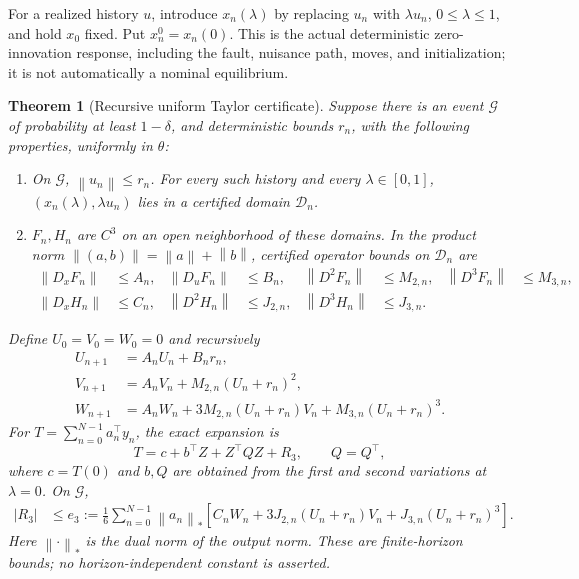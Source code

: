 \documentclass[11pt]{article}
\newtheorem{theorem}{Theorem}
\theoremstyle{remark}\newtheorem{remark}[theorem]{Remark}
\newcommand{\norm}[1]{\left\lVert#1\right\rVert}
\begin{document}
For a realized history $u$, introduce $x_n(\lambda)$ by replacing $u_n$ with $\lambda u_n$, $0\le\lambda\le1$, and hold $x_0$ fixed. Put $x_n^0=x_n(0)$. This is the actual deterministic zero-innovation response, including the fault, nuisance path, moves, and initialization; it is not automatically a nominal equilibrium.

\begin{theorem}[Recursive uniform Taylor certificate]\label{thm:taylor}
Suppose there is an event $\mathcal G$ of probability at least $1-\delta$, and deterministic bounds $r_n$, with the following properties, uniformly in $\theta$:
\begin{enumerate}
\item On $\mathcal G$, $\norm{u_n}\le r_n$. For every such history and every $\lambda\in[0,1]$, $(x_n(\lambda),\lambda u_n)$ lies in a certified domain $\mathcal D_n$.
\item $F_n,H_n$ are $C^3$ on an open neighborhood of these domains. In the product norm $\norm{(a,b)}=\norm a+\norm b$, certified operator bounds on $\mathcal D_n$ are
\begin{align*}
\norm{D_xF_n}&\le A_n,&\norm{D_uF_n}&\le B_n,
&\norm{D^2F_n}&\le M_{2,n},&\norm{D^3F_n}&\le M_{3,n},\\
\norm{D_xH_n}&\le C_n,&\norm{D^2H_n}&\le J_{2,n},
&\norm{D^3H_n}&\le J_{3,n}.
\end{align*}
\end{enumerate}
Define $U_0=V_0=W_0=0$ and recursively
\begin{align}
 U_{n+1}&=A_nU_n+B_nr_n,\label{eq:u}\\
 V_{n+1}&=A_nV_n+M_{2,n}(U_n+r_n)^2,\label{eq:v}\\
 W_{n+1}&=A_nW_n+3M_{2,n}(U_n+r_n)V_n
                  +M_{3,n}(U_n+r_n)^3.\label{eq:w}
\end{align}
For $T=\sum_{n=0}^{N-1}a_n^\top y_n$, the exact expansion is
\begin{equation}\label{eq:expand}
 T=c+b^\top Z+Z^\top QZ+R_3,\qquad Q=Q^\top,
\end{equation}
where $c=T(0)$ and $b,Q$ are obtained from the first and second variations at $\lambda=0$. On $\mathcal G$,
\begin{align}
 |R_3|&\le e_3:=\frac16\sum_{n=0}^{N-1}\norm{a_n}_*
 \left[C_nW_n+3J_{2,n}(U_n+r_n)V_n
                      +J_{3,n}(U_n+r_n)^3\right].\label{eq:e3}
\end{align}
Here $\norm{\cdot}_*$ is the dual norm of the output norm. These are finite-horizon bounds; no horizon-independent constant is asserted.
\end{theorem}
\end{document}
